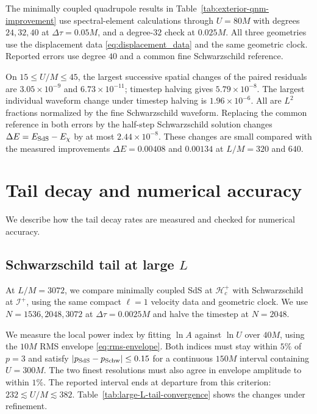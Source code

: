 \documentclass[
 aps,
 prd,
 reprint,
 superscriptaddress,
 nofootinbib,
 longbibliography
]{revtex4-2}
\newcommand{\scri}{\mathscr{I}}
\newcommand{\hc}{\mathcal{H}_{c}^{+}}
\begin{document}
The minimally coupled quadrupole results in
Table~\ref{tab:exterior-qnm-improvement} use spectral-element calculations through
$U=80M$ with degrees $24,32,40$ at $\Delta\tau=0.05M$, and a degree-$32$
check at $0.025M$.  All three geometries use the displacement data
\eqref{eq:displacement_data} and the same geometric clock.  Reported errors
use degree $40$ and a common fine Schwarzschild reference.

On $15\leq U/M\leq45$, the largest successive spatial changes of the
paired residuals are $3.05\times10^{-9}$ and $6.73\times10^{-11}$;
timestep halving gives $5.79\times10^{-8}$.  The largest individual waveform
change under timestep halving is $1.96\times10^{-6}$.  All are $L^2$
fractions normalized by the fine Schwarzschild waveform.  Replacing the
common reference in both errors by the half-step Schwarzschild solution
changes $\Delta E=E_{\rm SdS}-E_\chi$ by at most $2.44\times10^{-8}$.
These changes are small compared with the measured improvements
$\Delta E=0.00408$ and $0.00134$ at $L/M=320$ and $640$.

\section{Tail decay and numerical accuracy}
\label{app:latetime}

We describe how the tail decay rates are measured and checked for
numerical accuracy.

\subsection{Schwarzschild tail at large \texorpdfstring{$L$}{L}}
\label{app:large-L-tail}

At $L/M=3072$, we compare minimally coupled SdS at $\hc$ with Schwarzschild
at $\scri^+$, using the same compact $\ell=1$ velocity data and geometric
clock.  We use $N=1536,2048,3072$ at $\Delta\tau=0.0025M$ and halve the
timestep at $N=2048$.

We measure the local power index by fitting $\ln A$ against $\ln U$ over
$40M$, using the $10M$ RMS envelope \eqref{eq:rms-envelope}.  Both indices
must stay within $5\%$ of $p=3$ and satisfy
$|p_{\rm SdS}-p_{\rm Schw}|\leq0.15$ for a continuous $150M$ interval
containing $U=300M$.  The two finest resolutions must also agree in envelope
amplitude to within $1\%$.  The reported interval ends at departure from
this criterion: $232\lesssim U/M\lesssim382$.
Table~\ref{tab:large-L-tail-convergence} shows the changes under refinement.
\end{document}
